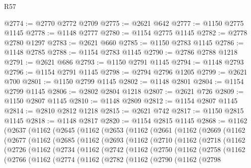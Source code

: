 \begin{lexlean}{R57}
\begin{coremodule}
@2774 := @2770 @2772 @2709
@2775 := @2621 @642
@2777 := @1150 @2775 @1145
@2778 := @1148 @2777
@2780 := @1154 @2775 @1145
@2782 := @2778 @2780 @1297
@2783 := @2621 @660
@2785 := @1150 @2783 @1145
@2786 := @1148 @2785
@2788 := @1154 @2783 @1145
@2790 := @2786 @2788 @1218
@2791 := @2621 @686
@2793 := @1150 @2791 @1145
@2794 := @1148 @2793
@2796 := @1154 @2791 @1145
@2798 := @2794 @2796 @1205
@2799 := @2621 @700
@2801 := @1150 @2799 @1145
@2802 := @1148 @2801
@2804 := @1154 @2799 @1145
@2806 := @2802 @2804 @1218
@2807 := @2621 @726
@2809 := @1150 @2807 @1145
@2810 := @1148 @2809
@2812 := @1154 @2807 @1145
@2814 := @2810 @2812 @1218
@2815 := @2621 @742
@2817 := @1150 @2815 @1145
@2818 := @1148 @2817
@2820 := @1154 @2815 @1145
@2868 := @1162
    (@2637
      (@1162
        (@2645
          (@1162
            (@2653
              (@1162
                (@2661
                  (@1162
                    (@2669
                      (@1162
                        (@2677
                          (@1162
                            (@2685
                              (@1162
                                (@2693
                                  (@1162
                                    (@2710
                                      (@1162
                                        (@2718
                                          (@1162
                                            (@2726
                                              (@1162
                                                (@2734
                                                  (@1162
                                                    (@2742
                                                      (@1162
                                                        (@2750
                                                          (@1162
                                                            (@2758
                                                              (@1162
                                                                (@2766
                                                                  (@1162
                                                                    (@2774
                                                                      (@1162
                                                                        (@2782
                                                                          (@1162
                                                                            (@2790
                                                                              (@1162
                                                                                (@2798

\end{coremodule}
\end{lexlean}
